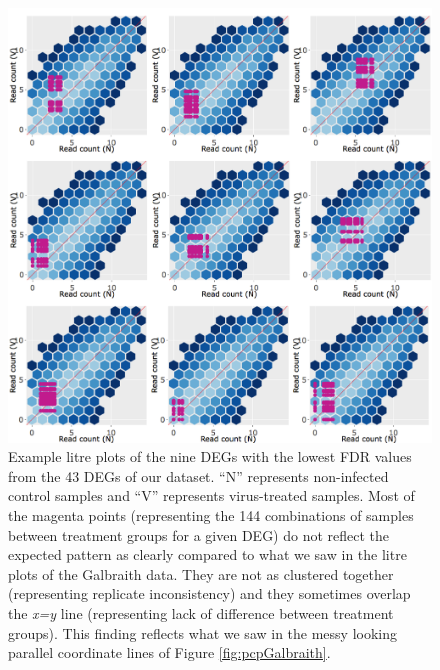 \documentclass[11pt,a4paper,oldfontcommands,openany]{memoir}
\numberwithin{equation}{section} %
\begin{document}
\begin{figure}[H]
\begin{framed}
  \includegraphics[width=\textwidth]{Images/litreClusterRutter}
\end{framed}
  \caption{Example litre plots of the nine DEGs with the lowest FDR values from the 43 DEGs of our dataset. ``N'' represents non-infected control samples and ``V'' represents virus-treated samples. Most of the magenta points (representing the 144 combinations of samples between treatment groups for a given DEG) do not reflect the expected pattern as clearly compared to what we saw in the litre plots of the Galbraith data. They are not as clustered together (representing replicate inconsistency) and they sometimes overlap the \textit{x=y} line (representing lack of difference between treatment groups). This finding reflects what we saw in the messy looking parallel coordinate lines of Figure \ref{fig:pcpGalbraith}.}
  \label{fig:litreClusterRutter}
\end{figure}
\end{document}
